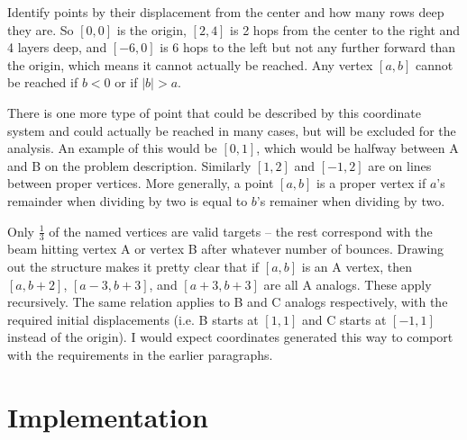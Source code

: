 \documentclass{article}
\begin{document}
\par

Identify points by their displacement from the center and how many rows deep they are.  So $[0, 0]$ is the origin, $[2, 4]$ is 2 hops from the center to the right and 4 layers deep, and $[-6, 0]$ is 6 hops to the left but not any further forward than the origin, which means it cannot actually be reached.  Any vertex $[a, b]$ cannot be reached if $b < 0$ or if $|b| > a$.

\par

There is one more type of point that could be described by this coordinate system and could actually be reached in many cases, but will be excluded for the analysis.  An example of this would be $[0, 1]$, which would be halfway between A and B on the problem description.  Similarly $[1, 2]$ and $[-1, 2]$ are on lines between proper vertices.  More generally, a point $[a, b]$ is a proper vertex if $a$'s remainder when dividing by two is equal to $b$'s remainer when dividing by two.

\par

Only ${\frac{1}{3}}$ of the named vertices are valid targets -- the rest correspond with the beam hitting vertex A or vertex B after whatever number of bounces.  Drawing out the structure makes it pretty clear that if $[a, b]$ is an A vertex, then $[a, b + 2]$, $[a - 3, b + 3]$, and $[a + 3, b + 3]$ are all A analogs.  These apply recursively.  The same relation applies to B and C analogs respectively, with the required initial displacements (i.e. B starts at $[1, 1]$ and C starts at $[-1, 1]$ instead of the origin).  I would expect coordinates generated this way to comport with the requirements in the earlier paragraphs.

\section*{Implementation}



\end{document}

